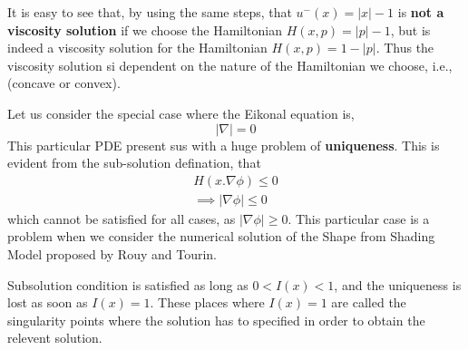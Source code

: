 \noindent It is easy to see that, by using the same steps, that $u^-(x) = \lvert x\rvert -1$ is \textbf{not a viscosity solution} if we choose the Hamiltonian $ H(x,p) = \lvert p\rvert -1$, but is indeed a viscosity solution for the Hamiltonian $H(x,p) = 1 - \lvert p \rvert$. Thus the viscosity solution si dependent on the nature of the Hamiltonian we choose, i.e., (concave or convex).

\noindent Let us consider the special case where the Eikonal equation is,
\begin{equation}
	\lvert \nabla\rvert = 0
\end{equation}
\noindent This particular PDE present sus with a huge problem of \textbf{uniqueness}. This is evident from the sub-solution defination, that
\begin{eqnarray}
	H(x.\nabla\phi) \le 0 \\
	\implies \lvert \nabla\phi\rvert \le 0
\end{eqnarray}
\noindent which cannot be satisfied for all cases, as $\lvert\nabla\phi\rvert \ge 0$. This particular case is a problem when we consider the numerical solution of the Shape from Shading Model proposed by Rouy and Tourin.

\noindent Subsolution condition is satisfied as long as $0 < I(x) < 1$, and the uniqueness is lost as soon as $I(x) = 1$. These places where $I(x) = 1$ are called the singularity points where the solution has to specified in order to obtain the relevent solution.